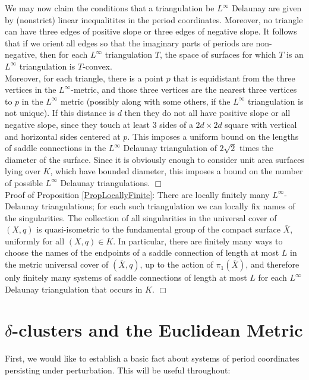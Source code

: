 \documentclass[12pt]{article}
\begin{document}
\noindent We may now claim the conditions that a triangulation be $L^\infty$ Delaunay are given by (nonstrict) linear inequalitites in the period coordinates. Moreover, no triangle can have three edges of positive slope or three edges of negative slope. It follows that if we orient all edges so that the imaginary parts of periods are non-negative, then for each $L^\infty$  triangulation $T$, the space of surfaces for which $T$ is an $L^\infty$  triangulation is $T$-convex.\\

\noindent Moreover, for each triangle, there is a point $p$ that is equidistant from the three vertices in the $L^\infty$-metric, and those three vertices are the nearest three vertices to $p$ in the $L^\infty$ metric (possibly along with some others, if the $L^\infty$  triangulation is not unique). If this distance is $d$ then they do not all have positive slope or all negative slope, since they touch at least 3 sides of a $2d \times 2d$ square with vertical and horizontal sides centered at $p$. This imposes a uniform bound on the lengths of saddle connections in the $L^\infty$ Delaunay triangulation of $2\sqrt{2}$ times the diameter of the surface. Since it is obviously enough to consider unit area surfaces lying over $K$, which have bounded diameter, this imposes a bound on the number of possible $L^\infty$ Delaunay triangulations. $\Box$\\

\noindent Proof of Proposition \ref{PropLocallyFinite}: There are locally finitely many $L^\infty$-Delaunay triangulations; for each such triangulation we can locally fix names of the singularities. The collection of all singularities in the universal cover of $(X,q)$ is quasi-isometric to the fundamental group of the compact surface $\bar{X}$, uniformly for all $(X,q) \in K$. In particular, there are finitely many ways to choose the names of the endpoints of a saddle connection of length at most $L$ in the metric universal cover of $(\bar{X},q)$, up to the action of $\pi_1(\bar{X})$, and therefore only finitely many systems of saddle connections of length at most $L$ for each $L^\infty$ Delaunay triangulation that occurs in $K$. $\Box$

\section{\texorpdfstring{$\delta$}{d}-clusters and the Euclidean Metric}

\noindent First, we would like to establish a basic fact about systems of period coordinates persisting under perturbation. This will be useful throughout:\\
\end{document}
